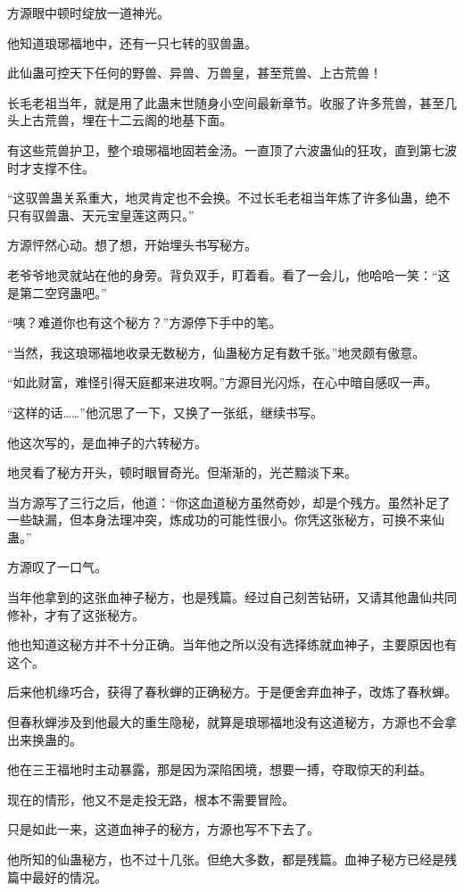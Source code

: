\begin{this_body}
方源眼中顿时绽放一道神光。

他知道琅琊福地中，还有一只七转的驭兽蛊。

此仙蛊可控天下任何的野兽、异兽、万兽皇，甚至荒兽、上古荒兽！

长毛老祖当年，就是用了此蛊末世随身小空间最新章节。收服了许多荒兽，甚至几头上古荒兽，埋在十二云阁的地基下面。

有这些荒兽护卫，整个琅琊福地固若金汤。一直顶了六波蛊仙的狂攻，直到第七波时才支撑不住。

“这驭兽蛊关系重大，地灵肯定也不会换。不过长毛老祖当年炼了许多仙蛊，绝不只有驭兽蛊、天元宝皇莲这两只。”

方源怦然心动。想了想，开始埋头书写秘方。

老爷爷地灵就站在他的身旁。背负双手，盯着看。看了一会儿，他哈哈一笑：“这是第二空窍蛊吧。”

“咦？难道你也有这个秘方？”方源停下手中的笔。

“当然，我这琅琊福地收录无数秘方，仙蛊秘方足有数千张。”地灵颇有傲意。

“如此财富，难怪引得天庭都来进攻啊。”方源目光闪烁，在心中暗自感叹一声。

“这样的话……”他沉思了一下，又换了一张纸，继续书写。

他这次写的，是血神子的六转秘方。

地灵看了秘方开头，顿时眼冒奇光。但渐渐的，光芒黯淡下来。

当方源写了三行之后，他道：“你这血道秘方虽然奇妙，却是个残方。虽然补足了一些缺漏，但本身法理冲突，炼成功的可能性很小。你凭这张秘方，可换不来仙蛊。”

方源叹了一口气。

当年他拿到的这张血神子秘方，也是残篇。经过自己刻苦钻研，又请其他蛊仙共同修补，才有了这张秘方。

他也知道这秘方并不十分正确。当年他之所以没有选择练就血神子，主要原因也有这个。

后来他机缘巧合，获得了春秋蝉的正确秘方。于是便舍弃血神子，改炼了春秋蝉。

但春秋蝉涉及到他最大的重生隐秘，就算是琅琊福地没有这道秘方，方源也不会拿出来换蛊的。

他在三王福地时主动暴露，那是因为深陷困境，想要一搏，夺取惊天的利益。

现在的情形，他又不是走投无路，根本不需要冒险。

只是如此一来，这道血神子的秘方，方源也写不下去了。

他所知的仙蛊秘方，也不过十几张。但绝大多数，都是残篇。血神子秘方已经是残篇中最好的情况。


\end{this_body}
